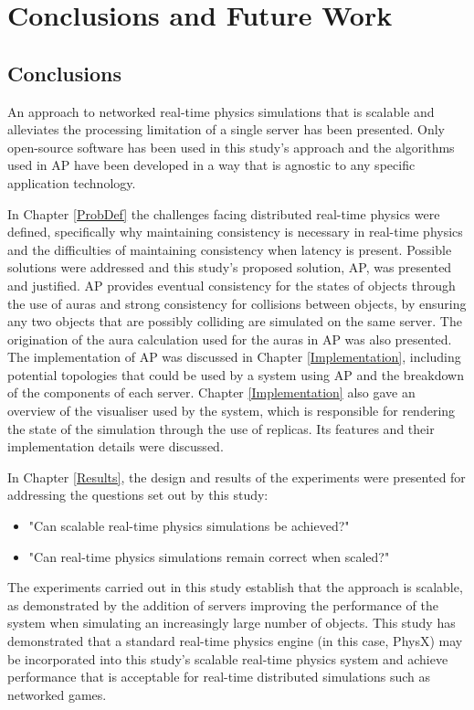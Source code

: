 \chapter{Conclusions and Future Work}
\section{Conclusions}
An approach to networked real-time physics simulations that is scalable and alleviates the processing limitation of a single server has been presented. Only open-source software has been used in this study's approach and the algorithms used in AP have been developed in a way that is agnostic to any specific application technology.

In Chapter \ref{ProbDef} the challenges facing distributed real-time physics were defined, specifically why maintaining consistency is necessary in real-time physics and the difficulties of maintaining consistency when latency is present. Possible solutions were addressed and this study's proposed solution, AP, was presented and justified. AP provides eventual consistency for the states of objects through the use of auras and strong consistency for collisions between objects, by ensuring any two objects that are possibly colliding are simulated on the same server. The origination of the aura calculation used for the auras in AP was also presented. The implementation of AP was discussed in Chapter \ref{Implementation}, including potential topologies that could be used by a system using AP and the breakdown of the components of each server. Chapter \ref{Implementation} also gave an overview of the visualiser used by the system, which is responsible for rendering the state of the simulation through the use of replicas. Its features and their implementation details were discussed.

In Chapter \ref{Results}, the design and results of the experiments were presented for addressing the questions set out by this study: 
\begin{itemize}
	\item "Can scalable real-time physics simulations be achieved?"
	\item "Can real-time physics simulations remain correct when scaled?"
\end{itemize}

The experiments carried out in this study establish that the approach is scalable, as demonstrated by the addition of servers improving the performance of the system when simulating an increasingly large number of objects. This study has demonstrated that a standard real-time physics engine (in this case, PhysX) may be incorporated into this study's scalable real-time physics system and achieve performance that is acceptable for real-time distributed simulations such as networked games.

